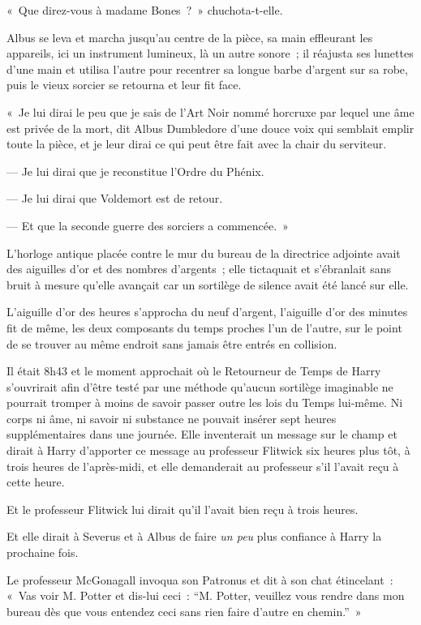 «~Que direz-vous à madame Bones~?~» chuchota-t-elle.

Albus se leva et marcha jusqu'au centre de la pièce, sa main effleurant les appareils, ici un instrument lumineux, là un autre sonore~; il réajusta ses lunettes d'une main et utilisa l'autre pour recentrer sa longue barbe d'argent sur sa robe, puis le vieux sorcier se retourna et leur fit face.

«~Je lui dirai le peu que je sais de l'Art Noir nommé horcruxe par lequel une âme est privée de la mort, dit Albus Dumbledore d'une douce voix qui semblait emplir toute la pièce, et je leur dirai ce qui peut être fait avec la chair du serviteur.

--- Je lui dirai que je reconstitue l'Ordre du Phénix.

--- Je lui dirai que Voldemort est de retour.

--- Et que la seconde guerre des sorciers a commencée.~»


L'horloge antique placée contre le mur du bureau de la directrice adjointe avait des aiguilles d'or et des nombres d'argents~; elle tictaquait et s'ébranlait sans bruit à mesure qu'elle avançait car un sortilège de silence avait été lancé sur elle.

L'aiguille d'or des heures s'approcha du neuf d'argent, l'aiguille d'or des minutes fit de même, les deux composants du temps proches l'un de l'autre, sur le point de se trouver au même endroit sans jamais être entrés en collision.

Il était 8h43 et le moment approchait où le Retourneur de Temps de Harry s'ouvrirait afin d'être testé par une méthode qu'aucun sortilège imaginable ne pourrait tromper à moins de savoir passer outre les lois du Temps lui-même. Ni corps ni âme, ni savoir ni substance ne pouvait insérer sept heures supplémentaires dans une journée. Elle inventerait un message sur le champ et dirait à Harry d'apporter ce message au professeur Flitwick six heures plus tôt, à trois heures de l'après-midi, et elle demanderait au professeur s'il l'avait reçu à cette heure.

Et le professeur Flitwick lui dirait qu'il l'avait bien reçu à trois heures.

Et elle dirait à Severus et à Albus de faire \emph{un peu} plus confiance à Harry la prochaine fois.

Le professeur McGonagall invoqua son Patronus et dit à son chat étincelant~: «~Vas voir M. Potter et dis-lui ceci~: “M. Potter, veuillez vous rendre dans mon bureau dès que vous entendez ceci sans rien faire d'autre en chemin.”~»
